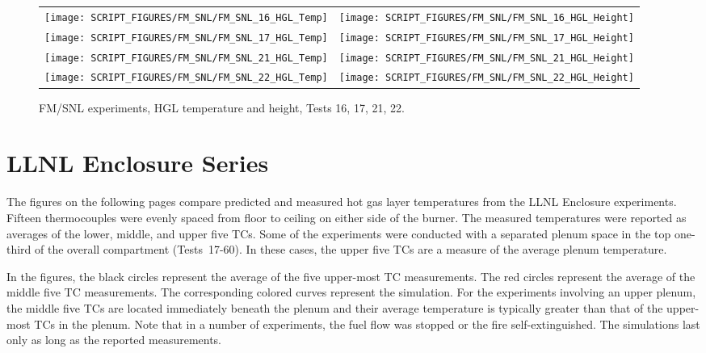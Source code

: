 \begin{figure}[p]
\begin{tabular*}{\textwidth}{l@{\extracolsep{\fill}}r}
\texttt{[image: SCRIPT\_FIGURES/FM\_SNL/FM\_SNL\_16\_HGL\_Temp]} &
\texttt{[image: SCRIPT\_FIGURES/FM\_SNL/FM\_SNL\_16\_HGL\_Height]} \\
\texttt{[image: SCRIPT\_FIGURES/FM\_SNL/FM\_SNL\_17\_HGL\_Temp]} &
\texttt{[image: SCRIPT\_FIGURES/FM\_SNL/FM\_SNL\_17\_HGL\_Height]} \\
\texttt{[image: SCRIPT\_FIGURES/FM\_SNL/FM\_SNL\_21\_HGL\_Temp]} &
\texttt{[image: SCRIPT\_FIGURES/FM\_SNL/FM\_SNL\_21\_HGL\_Height]} \\
\texttt{[image: SCRIPT\_FIGURES/FM\_SNL/FM\_SNL\_22\_HGL\_Temp]} &
\texttt{[image: SCRIPT\_FIGURES/FM\_SNL/FM\_SNL\_22\_HGL\_Height]}
\end{tabular*}
\caption[FM/SNL experiments, HGL temperature and height, Tests 16, 17, 21, 22]
{FM/SNL experiments, HGL temperature and height, Tests 16, 17, 21, 22.}
\label{FM_SNL_HGL_5}
\end{figure}

\clearpage


\section{LLNL Enclosure Series}

The figures on the following pages compare predicted and measured hot gas layer temperatures from the LLNL Enclosure experiments. Fifteen thermocouples were evenly spaced from floor to ceiling on either side of the burner. The measured temperatures were reported as averages of the lower, middle, and upper five TCs. Some of the experiments were conducted with a separated plenum space in the top one-third of the overall compartment (Tests~17-60). In these cases, the upper five TCs are a measure of the average plenum temperature.

In the figures, the black circles represent the average of the five upper-most TC measurements. The red circles represent the average of the middle five TC measurements. The corresponding colored curves represent the simulation. For the experiments involving an upper plenum, the middle five TCs are located immediately beneath the plenum and their average temperature is typically greater than that of the upper-most TCs in the plenum. Note that in a number of experiments, the fuel flow was stopped or the fire self-extinguished. The simulations last only as long as the reported measurements.

